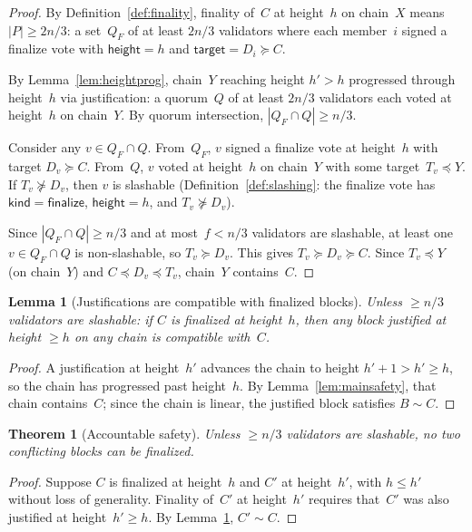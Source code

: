 \ifx\litemode\undefined\documentclass{article}\fi
\newcommand{\target}{\mathsf{target}}
\newcommand{\kind}{\mathsf{kind}}
\newcommand{\height}{\mathsf{height}}
\newcommand{\finalize}{\mathsf{finalize}}
\theoremstyle{plain}
\newtheorem{theorem}{Theorem}
\newtheorem{lemma}{Lemma}
\theoremstyle{definition}
\theoremstyle{remark}
\begin{document}
\begin{proof}
By Definition~\ref{def:finality}, finality of~$C$ at height~$h$ on chain~$X$ means $|P| \geq 2n/3$: a set~$Q_F$ of at least $2n/3$ validators where each member~$i$ signed a finalize vote with $\height = h$ and $\target = D_i \succeq C$.

By Lemma~\ref{lem:heightprog}, chain~$Y$ reaching height $h' > h$ progressed through height~$h$ via justification: a quorum~$Q$ of at least $2n/3$ validators each voted at height~$h$ on chain~$Y$.
By quorum intersection, $|Q_F \cap Q| \geq n/3$.

Consider any $v \in Q_F \cap Q$.
From~$Q_F$, $v$ signed a finalize vote at height~$h$ with target $D_v \succeq C$.
From~$Q$, $v$ voted at height~$h$ on chain~$Y$ with some target~$T_v \preceq Y$.
If $T_v \not\succeq D_v$, then $v$ is slashable (Definition~\ref{def:slashing}: the finalize vote has $\kind = \finalize$, $\height = h$, and $T_v \not\succeq D_v$).

Since $|Q_F \cap Q| \geq n/3$ and at most~$f < n/3$ validators are slashable, at least one $v \in Q_F \cap Q$ is non-slashable, so $T_v \succeq D_v$.
This gives $T_v \succeq D_v \succeq C$.
Since $T_v \preceq Y$ (on chain~$Y$) and $C \preceq D_v \preceq T_v$, chain~$Y$ contains~$C$.
\end{proof}

\begin{lemma}[Justifications are compatible with finalized blocks]\label{lem:justcompat}
Unless $\geq n/3$ validators are slashable: if $C$ is finalized at height~$h$, then any block justified at height $\geq h$ on any chain is compatible with~$C$.
\end{lemma}

\begin{proof}
A justification at height~$h'$ advances the chain to height $h' + 1 > h' \geq h$, so the chain has progressed past height~$h$.
By Lemma~\ref{lem:mainsafety}, that chain contains~$C$; since the chain is linear, the justified block satisfies $B \sim C$.
\end{proof}

\begin{theorem}[Accountable safety]\label{thm:safety}
Unless $\geq n/3$ validators are slashable, no two conflicting blocks can be finalized.
\end{theorem}

\begin{proof}
Suppose $C$ is finalized at height~$h$ and $C'$ at height~$h'$, with $h \leq h'$ without loss of generality.
Finality of~$C'$ at height~$h'$ requires that~$C'$ was also justified at height~$h' \geq h$.
By Lemma~\ref{lem:justcompat}, $C' \sim C$.
\end{proof}
\end{document}
